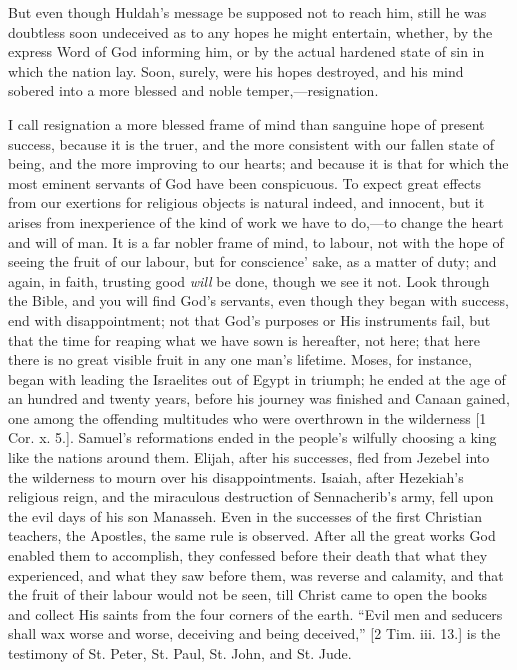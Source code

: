 But even though Huldah's message be supposed not to reach him,
still he was doubtless soon undeceived as to any hopes he might
entertain, whether, by the express Word of God informing him, or by
the actual hardened state of sin in which the nation lay. Soon,
surely, were his hopes destroyed, and his mind sobered into a more
blessed and noble temper,—resignation.

I call resignation a more blessed frame of mind than sanguine hope
of present success, because it is the truer, and the more consistent
with our fallen state of being, and the more improving to our hearts;
and because it is that for which the most eminent servants of God have
been conspicuous. To expect great effects from our exertions for
religious objects is natural indeed, and innocent, but it arises from
inexperience of the kind of work we have to do,—to change the heart
and will of man. It is a far nobler frame of mind, to labour, not with
the hope of seeing the fruit of our labour, but for conscience' sake,
as a matter of duty; and again, in faith, trusting good \emph{will} be
done, though we see it not. Look through the Bible, and you will find
God's servants, even though they began with success, end with
disappointment; not that God's purposes or His instruments fail, but
that the time for reaping what we have sown is hereafter, not here;
that here there is no great visible fruit in any one man's lifetime.
Moses, for instance, began with leading the Israelites out of Egypt in
triumph; he ended at the age of an hundred and twenty years, before
his journey was finished and Canaan gained, one among the offending
multitudes who were overthrown in the wilderness [1 Cor. x. 5.].
Samuel's reformations ended in the people's wilfully choosing a king
like the nations around them. Elijah, after his successes, fled from
Jezebel into the wilderness to mourn over his disappointments. Isaiah,
after Hezekiah's religious reign, and the miraculous destruction of
Sennacherib's army, fell upon the evil days of his son Manasseh. Even
in the successes of the first Christian teachers, the Apostles, the
same rule is observed. After all the great works God enabled them to
accomplish, they confessed before their death that what they
experienced, and what they saw before them, was reverse and calamity,
and that the fruit of their labour would not be seen, till Christ came
to open the books and collect His saints from the four corners of the
earth. ``Evil men and seducers shall wax worse and worse,
deceiving and being deceived,'' [2 Tim. iii. 13.] is the testimony
of St. Peter, St. Paul, St. John, and St. Jude.

